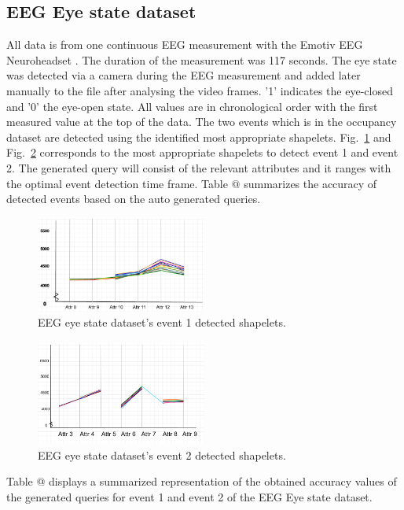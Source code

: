 \documentclass[conference]{IEEEtran}  %
\makeatletter
\newcommand*{\rom}[1]{\expandafter\@slowromancap\romannumeral #1@}
\makeatother
\begin{document}
\subsection{EEG Eye state dataset}
All data is from one continuous EEG measurement with the Emotiv EEG Neuroheadset \cite{IEEEexample:EEG}. The duration of the measurement was 117 seconds. The eye state was detected via a camera during the EEG measurement and added later manually to the file after analysing the video frames. '1' indicates the eye-closed and '0' the eye-open state. All values are in chronological order with the first measured value at the top of the data. The two events which is in the occupancy dataset are detected using the identified most appropriate shapelets. Fig.~\ref{fig:EEGEvent1} and Fig.~\ref{fig:EEGevent2} corresponds to the most appropriate shapelets to detect event 1 and event 2. The generated query will consist of the relevant attributes and it ranges with the optimal event detection time frame. Table \rom{2} summarizes the accuracy of detected events based on the auto generated queries.

\begin{figure}[h!]
\includegraphics[width=0.5\textwidth]{EEG_event1.png}
\caption{EEG eye state dataset's event 1 detected shapelets.}
\label{fig:EEGEvent1}
\end{figure}

\begin{figure}[h!]
\includegraphics[width=0.5\textwidth]{EEG_event2.png}
\caption{EEG eye state dataset's event 2 detected shapelets.}
\label{fig:EEGevent2}
\end{figure}

Table \rom{2} displays a summarized representation of the obtained accuracy values of the generated queries for event 1 and event 2 of the EEG Eye state dataset.
\end{document}
